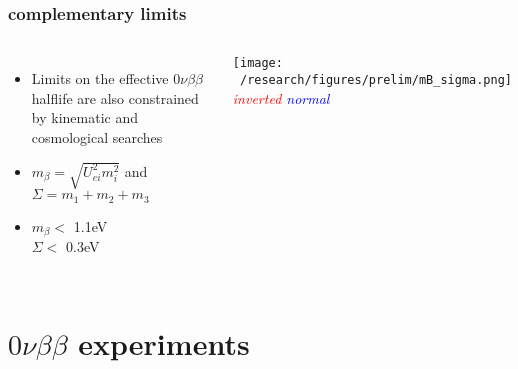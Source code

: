 \documentclass{beamer}
\begin{document}
	\begin{frame}
		\frametitle{complementary limits}
		\begin{columns}[c] %
			
			\begin{itemize}
				\setlength\itemsep{2em}
				\item Limits on the effective $0\nu\beta\beta$ halflife are also constrained by kinematic and cosmological searches
				\item $m_{\beta} = \sqrt{U_{ei}^2 m_i^2}$ and $\Sigma = m_1 + m_2 + m_3$
				\item $m_{\beta} <$ 1.1eV \\ $\Sigma <$ 0.3eV
			\end{itemize}
			
			\hspace*{-0.8cm}\texttt{[image: ~/research/figures/prelim/mB\_sigma.png]}
			\footnotesize{\textit{\textcolor{red}{inverted} \textcolor{blue}{normal}}}
			
		\end{columns}
	\end{frame}

\section{$0\nu\beta\beta$ experiments}
	
\end{document}
